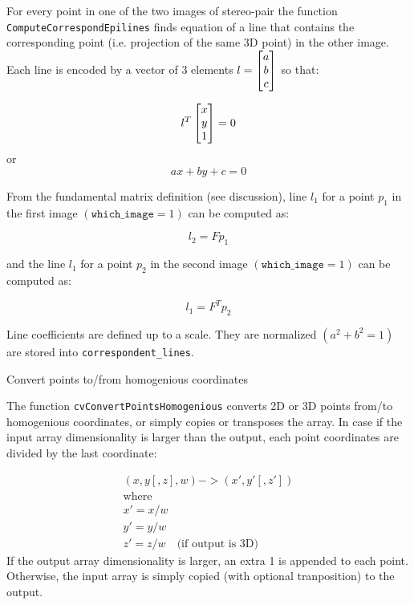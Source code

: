For every point in one of the two images of stereo-pair the function
\texttt{ComputeCorrespondEpilines} finds equation of a line that
contains the corresponding point (i.e. projection of the same 3D
point) in the other image. Each line is encoded by a vector of 3
elements $l = \begin{bmatrix} a\\ b\\ c \end{bmatrix}$ so that:

\[ l^T \begin{bmatrix} x\\ y\\ 1 \end{bmatrix} = 0 \]
or
\[ a x + b y + c = 0 \]

From the fundamental matrix definition (see 
discussion), line $l_1$ for a point $p_1$ in the first image
$(\texttt{which\_image} =1)$ can be computed as:

\[ l_2 = F p_1 \]

and the line $l_1$ for a point $p_2$ in the second image $(\texttt{which\_image} =1)$ can be computed as:

\[ l_1 = F^T p_2 \]

Line coefficients are defined up to a scale. They are normalized $(a^2+b^2=1)$ are stored into \texttt{correspondent\_lines}.

\label{ConvertPointsHomogenious}

Convert points to/from homogenious coordinates


\begin{description}
\end{description}

The function \texttt{cvConvertPointsHomogenious} converts 2D or 3D points from/to homogenious coordinates, or simply copies or transposes the array. In case if the input array dimensionality is larger than the output, each point coordinates are divided by the last coordinate:

\[
\begin{array}{l}
(x,y[,z],w) -> (x',y'[,z'])\\
\text{where} \\
x' = x/w \\
y' = y/w \\
z' = z/w \quad \text{(if output is 3D)}
\end{array}
\]
If the output array dimensionality is larger, an extra 1 is appended to each point.  Otherwise, the input array is simply copied (with optional tranposition) to the output.

